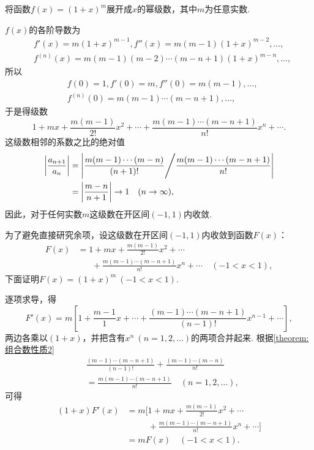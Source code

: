 \begin{example}
将函数\(f(x) = (1+x)^m\)展开成\(x\)的幂级数，其中\(m\)为任意实数.
\begin{solution}
\(f(x)\)的各阶导数为\begin{align*}
	&f'(x) = m (1+x)^{m-1},
	f''(x) = m(m-1) (1+x)^{m-2},
	\dotsc, \\
	&f^{(n)}(x) = m(m-1)(m-2)\dotsm(m-n+1) (1+x)^{m-n},
	\dotsc,
\end{align*}
所以\begin{align*}
	&f(0) = 1,
	f'(0) = m,
	f''(0) = m(m-1),
	\dotsc, \\
	&f^{(n)}(0) = m(m-1)\dotsm(m-n+1),\dotsc,
\end{align*}
于是得级数\begin{equation*}
	1+mx+\frac{m(m-1)}{2!}x^2+\dotsb+\frac{m(m-1)\dotsm(m-n+1)}{n!}x^n+\dotsb.
\end{equation*}
这级数相邻的系数之比的绝对值\begin{align*}
	\abs{\frac{a_{n+1}}{a_n}}
	&= \abs{ \frac{m(m-1)\dotsm(m-n)}{(n+1)!} \Bigg/ \frac{m(m-1)\dotsm(m-n+1)}{n!} } \\
	&= \abs{ \frac{m-n}{n+1} }
	\to 1 \quad(n\to\infty),
\end{align*}
因此，对于任何实数\(m\)这级数在开区间\((-1,1)\)内收敛.

为了避免直接研究余项，设这级数在开区间\((-1,1)\)内收敛到函数\(F(x)\)：\begin{align*}
	F(x)
	&= 1+mx+\frac{m(m-1)}{2!}x^2+\dotsb \\
	&\hspace{20pt}+\frac{m(m-1)\dotsm(m-n+1)}{n!}x^n+\dotsb
	\quad(-1<x<1),
\end{align*}
下面证明\(F(x) = (1+x)^m\ (-1<x<1)\).

逐项求导，得\begin{equation*}
	F'(x) = m \left[
		1+\frac{m-1}{1}x+\dotsb+\frac{(m-1)\dotsm(m-n+1)}{(n-1)!}x^{n-1}+\dotsb
	\right],
\end{equation*}
两边各乘以\((1+x)\)，并把含有\(x^n\ (n=1,2,\dotsc)\)的两项合并起来.
根据\cref{theorem:组合数性质2}
\begin{align*}
	&\frac{(m-1)\dotsm(m-n+1)}{(n-1)!}
		+ \frac{(m-1)\dotsm(m-n)}{n!} \\
	&= \frac{m(m-1)\dotsm(m-n+1)}{n!}
		\quad(n=1,2,\dotsc),
\end{align*}
可得\begin{align*}
	(1+x) F'(x)
	&= m \Biggl[
	1+mx+\frac{m(m-1)}{2!}x^2+\dotsb \\
	&\hspace{30pt} +\frac{m(m-1)\dotsm(m-n+1)}{n!}x^n+\dotsb
	\Biggr] \\
	&= m F(x)
	\quad(-1<x<1).
\end{align*}


\end{solution}
\end{example}
